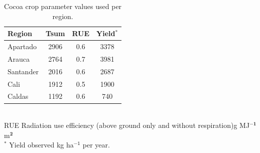 \documentclass[gene,journal,article,submit,moreauthors,pdftex]{Definitions/mdpi}
\begin{document}
\begin{table}[h!]	
	\caption {\footnotesize {Cocoa crop parameter values used per region.}}
	\label{tab:reparam} 
	\centering
	\begin{small}
		\begin{tabular}{l c c c }
			\hline
			{\bf Region }&{\bf Tsum }&{\bf RUE}&{\bf Yield$^{*}$}\\
			\hline
			Apartado   & 2906 & 0.6 & 3378  \\
			Arauca   & 2764 & 0.7 & 3981  \\
			Santander & 2016 &0.6 & 2687 \\
			Cali   & 1912 & 0.5 & 1900  \\
			Caldas   & 1192 & 0.6 & 740  \\
			\hline
		\end{tabular} \\
		{\footnotesize RUE Radiation use efficiency (above ground only and without respiration)g MJ$^{\mathbf{-1}}$ m$^{\mathbf{2}}$\\$^{*}$ Yield observed kg ha$^{\mathsf{-1}}$ per year. } 
	\end{small}
\end{table}
\end{document}
